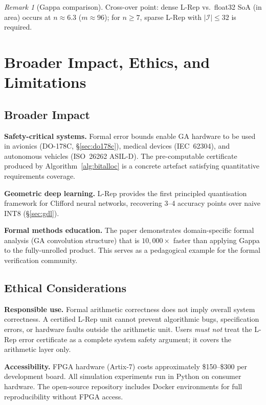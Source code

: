 \documentclass[11pt,a4paper]{article}
\theoremstyle{definition}
\theoremstyle{plain}
\theoremstyle{remark}
\newtheorem{remark}{Remark}[section]
\begin{document}
\begin{remark}[Gappa comparison]
Cross-over point: dense L-Rep vs.\ float32 SoA
(in area) occurs at $n\approx6.3$ ($m\approx96$);
for $n\ge7$, sparse L-Rep with $|\mathcal{I}|\le32$ is required.

\section{Broader Impact, Ethics, and Limitations}
\label{sec:discuss}

\subsection{Broader Impact}

\textbf{Safety-critical systems.}
Formal error bounds enable GA hardware to be used in avionics
(DO-178C, \S\ref{sec:do178c}), medical devices (IEC~62304), and
autonomous vehicles (ISO~26262 ASIL-D).
The pre-computable certificate produced by Algorithm~\ref{alg:bitalloc}
is a concrete artefact satisfying quantitative requirements coverage.

\textbf{Geometric deep learning.}
L-Rep provides the first principled quantisation framework for Clifford
neural networks, recovering 3--4 accuracy points over naive INT8
(\S\ref{sec:gdl}).

\textbf{Formal methods education.}
The paper demonstrates domain-specific formal analysis (GA convolution
structure) that is $10{,}000\times$ faster than applying Gappa to the
fully-unrolled product.
This serves as a pedagogical example for the formal verification
community.

\subsection{Ethical Considerations}

\textbf{Responsible use.}
Formal arithmetic correctness does not imply overall system
correctness.
A certified L-Rep unit cannot prevent algorithmic bugs, specification
errors, or hardware faults outside the arithmetic unit.
Users \emph{must not} treat the L-Rep error certificate as a complete
system safety argument; it covers the arithmetic layer only.

\textbf{Accessibility.}
FPGA hardware (Artix-7) costs approximately \$150--\$300 per
development board.
All simulation experiments run in Python on consumer hardware.
The open-source repository includes Docker environments for
full reproducibility without FPGA access.


\end{remark}
\end{document}
